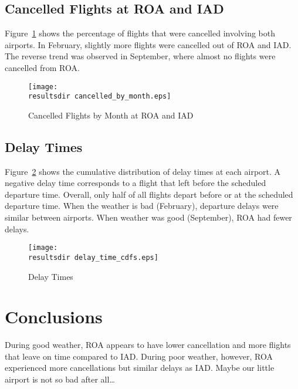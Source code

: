 \documentclass[dvips,letterpaper]{article}
\newcommand{\resultsdir}{../../results/2014-05-23/}
\begin{document}
\subsection{Cancelled Flights at ROA and IAD}
\label{sub:canelled}
Figure~\ref{fig:cancelled_by_month} shows the percentage of flights that were cancelled involving both airports.
In February, slightly more flights were cancelled out of ROA and IAD.
The reverse trend was observed in September, where almost no flights were cancelled from ROA.
\begin{figure}[!htbp]
  \centering
  \texttt{[image: \\resultsdir cancelled\_by\_month.eps]}
  \caption{Cancelled Flights by Month at ROA and IAD}
  \label{fig:cancelled_by_month}
\end{figure}

\subsection{Delay Times}
\label{sub:delay_cdf}
Figure~\ref{fig:ecdf_delays} shows the cumulative distribution of delay times at each airport.
A negative delay time corresponds to a flight that left before the scheduled departure time.
Overall, only half of all flights depart before or at the scheduled departure time.
When the weather is bad (February), departure delays were similar between airports.
When weather was good (September), ROA had fewer delays.

\begin{figure}[!htbp]
  \centering
  \texttt{[image: \\resultsdir delay\_time\_cdfs.eps]}
  \caption{Delay Times}
  \label{fig:ecdf_delays}
\end{figure}

\section{Conclusions}
\label{sec:Conclusions}
During good weather, ROA appears to have lower cancellation and more flights that leave on time compared to IAD.
During poor weather, however, ROA experienced more cancellations but similar delays as IAD.
Maybe our little airport is not so bad after all\ldots
\end{document}
